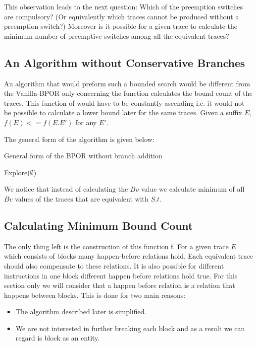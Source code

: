 This observation leads to the next question: Which of the preemption switches are compulsory? (Or equivalently which traces cannot be produced without a preemption switch?)
Moreover is it possible for a given trace to calculate the minimum number of preemptive switches among all the equivalent traces?

\subsection{An Algorithm without Conservative Branches}
An algorithm that would preform such a bounded search would be different from the Vanilla-BPOR only concerning the function calculates the bound count of the traces.
This function of would have to be constantly ascending i.e. it would not be possible to calculate a lower bound later for the same traces.
Given a suffix $E$, $f(E) <= f(E.E')$ for any $E'$.

The general form of the algorithm is given below:

\begin{algorithm}[H]
    \SetAlgoLined
    \caption{General form of the BPOR without branch addition}
    Explore($\emptyset$)\;
\end{algorithm}

We notice that instead of calculating the $Bv$ value we calculate minimum of all $Bv$ values of the traces that are equivalent with $S.t$.

\subsection{Calculating Minimum Bound Count}
The only thing left is the construction of this function f.
For a given trace $E$ which consists of blocks many happen-before relations hold. Each equivalent trace should also compensate to these relations.
It is also possible for different instructions in one block different happen before relations hold true. For this section only we will consider that 
a happen before relation is a relation that happens between blocks. This is done for two main reasons:

\begin{itemize}
    \item The algorithm described later is simplified.
    \item We are not interested in further breaking each block and as a result we can regard is block as an entity.
\end{itemize}

